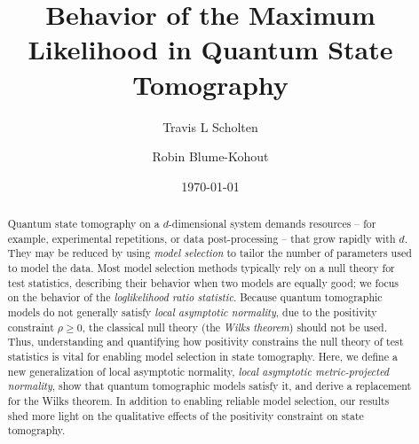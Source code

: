 \documentclass[aps,pra, twocolumn]{revtex4-1}
\begin{document}
\author{Travis L Scholten}
\author{Robin Blume-Kohout}

\title{Behavior of the Maximum Likelihood in Quantum State Tomography}

\begin{abstract}
Quantum state tomography on a $d$-dimensional system demands resources -- for example, experimental repetitions, or data post-processing -- that grow rapidly with $d$. They may be reduced by using \emph{model selection} to tailor the number of parameters used to model the data.  Most model selection methods typically rely on a null theory for test statistics, describing their behavior when two models are equally good; we focus on the behavior of the \emph{loglikelihood ratio statistic}.  Because quantum tomographic models do not generally satisfy \emph{local asymptotic normality}, due to the positivity constraint $\rho\geq 0$, the classical null theory (the \emph{Wilks theorem}) should not be used.  Thus, understanding and quantifying how positivity constrains the null theory of test statistics is vital for enabling model selection in state tomography.  Here, we define a new generalization of local asymptotic normality, \emph{local asymptotic metric-projected normality}, show that quantum tomographic models satisfy it, and derive a replacement for the Wilks theorem. In addition to enabling reliable model selection, our results shed more light on the qualitative effects of the positivity constraint on state tomography.
\end{abstract}
\date{\today}

\maketitle
\end{document}
